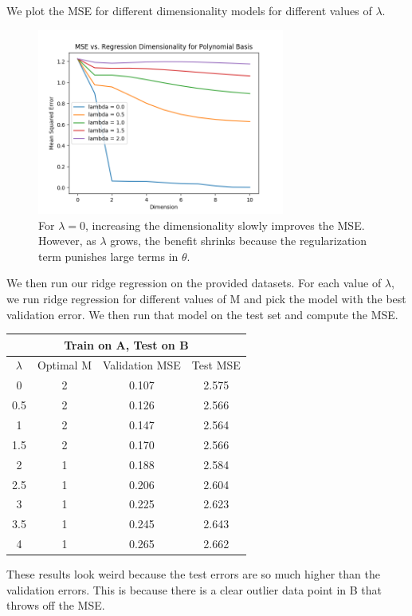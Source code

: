 \documentclass[8pt]{article}
\begin{document}
We plot the MSE for different dimensionality models for different values of $\lambda$.
%
\begin{figure}[H]
  \centering
  \includegraphics[width = 3.2in]{../P3/figs/poly_basis.png}
  \caption*{For $\lambda = 0$, increasing the dimensionality slowly improves the MSE. However, as $\lambda$ grows, the benefit shrinks because the regularization term punishes large terms in $\theta$.}
\end{figure}
%
We then run our ridge regression on the provided datasets. For each value of $\lambda$, we run ridge regression for different values of M and pick the model with the best validation error. We then run that model on the test set and compute the MSE.
%
\begin{center}
 \begin{tabular}{||c c c c||} 
 \hline
 \multicolumn{4}{|c|}{Train on A, Test on B} \\
 \hline
 \hline
 $\lambda$ & Optimal M & Validation MSE & Test MSE\\ [0.5ex] 
 \hline\hline
 0 & 2 & 0.107 & 2.575 \\ 
 \hline
 0.5 & 2 & 0.126 & 2.566 \\
 \hline
 1 & 2 & 0.147 & 2.564 \\
 \hline
 1.5 & 2 & 0.170 & 2.566 \\
 \hline
2 & 1 & 0.188 & 2.584 \\
 \hline
2.5 & 1 & 0.206 & 2.604 \\
 \hline
3 & 1 & 0.225 & 2.623 \\
 \hline
 3.5 & 1 & 0.245 & 2.643 \\
 \hline
4 & 1 & 0.265 & 2.662 \\
 \hline
\end{tabular}
\end{center}
%
These results look weird because the test errors are so much higher than the validation errors. This is because there is a clear outlier data point in B that throws off the MSE.
\end{document}
